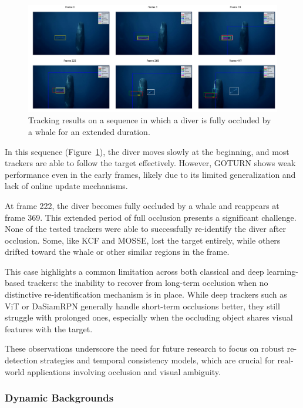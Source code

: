 \begin{figure}[ht]
    \centering
    \includegraphics[width=1\textwidth]{images/FreeDiver1.png}
    \caption{Tracking results on a sequence in which a diver is fully occluded by a whale for an extended duration.}
    \label{fig:occlusion_example}
\end{figure}

In this sequence (Figure~\ref{fig:occlusion_example}), the diver moves slowly at the beginning, and most trackers are able to follow the target effectively. However, GOTURN shows weak performance even in the early frames, likely due to its limited generalization and lack of online update mechanisms.

At frame 222, the diver becomes fully occluded by a whale and reappears at frame 369. This extended period of full occlusion presents a significant challenge. None of the tested trackers were able to successfully re-identify the diver after occlusion. Some, like KCF and MOSSE, lost the target entirely, while others drifted toward the whale or other similar regions in the frame.

This case highlights a common limitation across both classical and deep learning-based trackers: the inability to recover from long-term occlusion when no distinctive re-identification mechanism is in place. While deep trackers such as ViT or DaSiamRPN generally handle short-term occlusions better, they still struggle with prolonged ones, especially when the occluding object shares visual features with the target.

These observations underscore the need for future research to focus on robust re-detection strategies and temporal consistency models, which are crucial for real-world applications involving occlusion and visual ambiguity.


\subsubsection{Dynamic Backgrounds}
    

